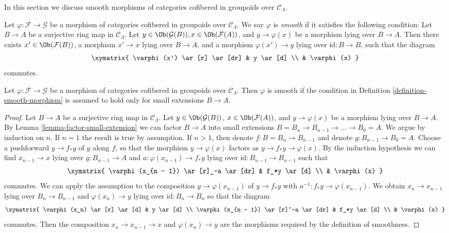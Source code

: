 \noindent
In this section we discuss smooth morphisms of categories
cofibered in groupoids over $\mathcal{C}_\Lambda$.

\begin{definition}
\label{definition-smooth-morphism}
Let $\varphi : \mathcal{F} \to \mathcal{G}$ be a morphism of categories
cofibered in groupoids over $\mathcal{C}_\Lambda$.  We say  $\varphi$ is
{\it smooth} if it satisfies the following condition: Let $B \to A$ be
a surjective ring map in $\mathcal{C}_\Lambda$.  Let $y \in
\Ob(\mathcal{G}(B)), x \in \Ob(\mathcal{F}(A))$, and $y
\to \varphi(x)$ be a morphism lying over $B \to A$.  Then there
exists $x' \in \Ob(\mathcal{F}(B))$, a morphism $x' \to x$
lying over $B \to A$, and a morphism $\varphi(x') \to y$ lying
over $\text{id}: B \to B$, such that the diagram
$$
\xymatrix{
\varphi(x') \ar[r] \ar[dr] & y \ar[d] \\
& \varphi(x)
}
$$
commutes.
\end{definition}

\begin{lemma}
\label{lemma-smoothness-small-extensions}
Let $\varphi : \mathcal{F} \to \mathcal{G}$ be a morphism of categories
cofibered in groupoids over $\mathcal{C}_\Lambda$.  Then $\varphi$ is smooth
if the condition in Definition \ref{definition-smooth-morphism} is assumed to
hold only for small extensions $B \to A$.
\end{lemma}

\begin{proof}
Let $B \to A$ be a surjective ring map in $\mathcal{C}_\Lambda$.
Let $y \in \Ob(\mathcal{G}(B))$, $x \in \Ob(\mathcal{F}(A))$,
and $y \to \varphi(x)$ be a morphism lying over $B \to A$. By
Lemma \ref{lemma-factor-small-extension} we can factor $B \to A$ into
small extensions $B = B_n \to B_{n-1} \to \ldots \to B_0 = A$.
We argue by induction on $n$. If $n = 1$ the result is true by assumption.
If $n > 1$, then denote $f : B = B_n \to B_{n - 1}$ and denote
$g : B_{n - 1} \to B_0 = A$. Choose a pushforward
$y \to f_* y$ of $y$ along $f$, so that the morphism $y \to \varphi(x)$
factors as $y \to f_* y \to \varphi(x)$. By the induction hypothesis
we can find $x_{n - 1} \to x$ lying over $g : B_{n - 1} \to A$ and
$a : \varphi(x_{n - 1}) \to f_*y$ lying over
$\text{id} : B_{n - 1} \to B_{n - 1}$ such that
$$
\xymatrix{
\varphi(x_{n - 1}) \ar[r]_-a \ar[dr] & f_*y \ar[d] \\
& \varphi(x)
}
$$
commutes. We can apply the assumption to the composition
$y \to \varphi(x_{n - 1})$ of
$y \to f_*y$ with $a^{-1} : f_*y \to \varphi(x_{n - 1})$. We obtain
$x_n \to x_{n - 1}$ lying over $B_n \to B_{n - 1}$ and
$\varphi(x_n) \to y$ lying over  $\text{id} : B_n \to B_n$ so that the diagram
$$
\xymatrix{
\varphi(x_n) \ar[r] \ar[d] & y \ar[d] \\
\varphi(x_{n - 1}) \ar[r]^-a \ar[dr] & f_*y \ar[d] \\
& \varphi(x)
}
$$
commutes. Then the composition $x_n \to x_{n - 1} \to x$ and
$\varphi(x_n) \to y$ are the morphisms required by the definition of
smoothness.
\end{proof}

